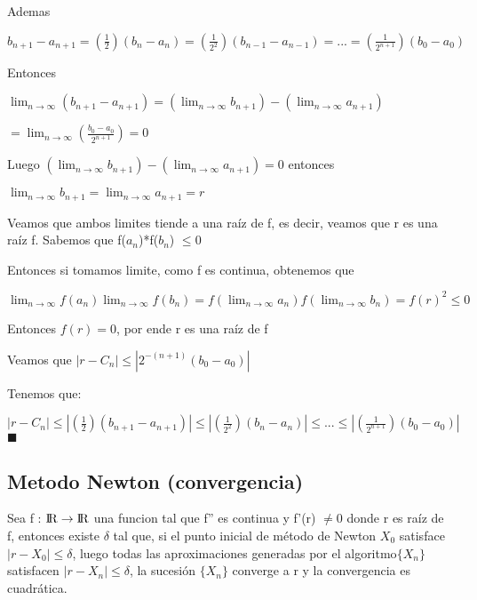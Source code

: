 \documentclass{article}
\begin{document}
Ademas

$ b_{n+1} - a_{n+1} = \left( \displaystyle\frac{1}{2} \right) (b_{n} - a_{n}) = \left( \displaystyle\frac{1}{2^2} \right) (b_{n-1} - a_{n-1}) 
= ... =\left( \displaystyle\frac{1}{2^{n+1}} \right) (b_0 - a_0) $ 

Entonces

$\lim_{n \to \infty} ({b_{n+1}-a_{n+1}}) = {(\lim_{n \to \infty} b_{n+1}) -(\lim_{n \to \infty}a_{n+1})} $ 

$= \lim_{n \to \infty} \left( \displaystyle\frac{b_0-a_0}{2^{n+1}} \right) = 0$

 \vspace{5mm}

Luego $ {(\lim_{n \to \infty} b_{n+1}) -(\lim_{n \to \infty}a_{n+1})} = 0 $ entonces

$ \lim_{n \to \infty} b_{n+1} = \lim_{n \to \infty} a_{n+1} = r $

 \vspace{5mm}

Veamos que ambos limites tiende a una raíz de f, es decir, veamos que r es una raíz f. Sabemos que f($a_n$)*f($b_n$) $ \leq 0 $

Entonces si tomamos limite, como f es continua, obtenemos que

$ \lim_{n \to \infty} f(a_{n})\lim_{n \to \infty} f(b_{n}) = f(\lim_{n \to \infty} a_{n})f(\lim_{n \to \infty} b_{n}) = f(r)^2 \leq 0 $

Entonces $f(r) = 0$, por ende r es una raíz de f

Veamos que $| r - C_n | \leq | 2^{-(n+1)}(b_0 - a_0) |$

Tenemos que:

$\left| r - C_n \right| \leq \left| \left( \displaystyle\frac{1}{2} \right)(b_{n+1}-a_{n+1}) \right| \leq \left| \left( \displaystyle\frac{1}{2^2} \right)(b_{n}-a_{n}) \right| \leq ... \leq
 \left| \left( \displaystyle\frac{1}{2^{n+1}} \right)(b_0-a_0) \right| $ $\blacksquare$




 \vspace{5mm}


\subsection{Metodo Newton (convergencia)}\label{Metodo-Newton-(convergencia)}

Sea f : ${\rm I\!R} \rightarrow {\rm I\!R}$ una funcion tal que f'' es continua y f'(r) $ \not= 0$ donde r es raíz de f, 
entonces existe $ \delta$ tal que, si el punto inicial de método de Newton $X_0$ satisface $ |r-X_0| \leq \delta $, luego todas las aproximaciones
generadas por el algoritmo$\{X_n\}$ satisfacen $|r-X_n| \leq \delta$, la sucesión $\{X_n\}$ converge a r y la convergencia es cuadrática.
\end{document}
